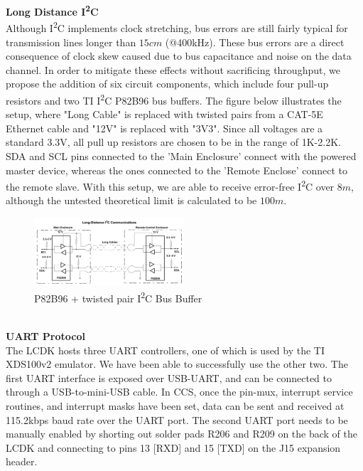 \textbf{Long Distance I\textsuperscript{2}C}\\
Although I\textsuperscript{2}C implements clock stretching, bus errors are still fairly typical for transmission lines longer than $15cm$ (@400kHz). These bus errors are a direct consequence of clock skew caused due to bus capacitance and noise on the data channel. In order to mitigate these effects without sacrificing throughput, we propose the addition of six circuit components, which include four pull-up resistors and two TI I\textsuperscript{2}C P82B96 bus buffers. The figure below illustrates the setup, where "Long Cable" is replaced with twisted pairs from a CAT-5E Ethernet cable and "12V" is replaced with "3V3". Since all voltages are a standard 3.3V, all pull up resistors are chosen to be in the range of 1K-2.2K. SDA and SCL pins connected to the 'Main Enclosure' connect with the powered master device, whereas the ones connected to the 'Remote Enclose' connect to the remote slave. With this setup, we are able to receive error-free I\textsuperscript{2}C over $8m$, although the untested theoretical limit is calculated to be $100m$.\\
\begin{figure}[h!]
  \caption{P82B96 + twisted pair I\textsuperscript{2}C Bus Buffer}
  \includegraphics[width=0.5\textwidth]{images/buffer.png}
\end{figure}\\

\textbf{UART Protocol}\\
The LCDK hosts three UART controllers, one of which is used by the TI XDS100v2 emulator. We have been able to successfully use the other two. The first UART interface is exposed over USB-UART, and can be connected to through a USB-to-mini-USB cable. In CCS, once the pin-mux, interrupt service routines, and interrupt masks have been set, data can be sent and received at 115.2kbps baud rate over the UART port. The second UART port needs to be manually enabled by shorting out solder pads R206 and R209 on the back of the LCDK and connecting to pins 13 [RXD] and 15 [TXD] on the J15 expansion header.


